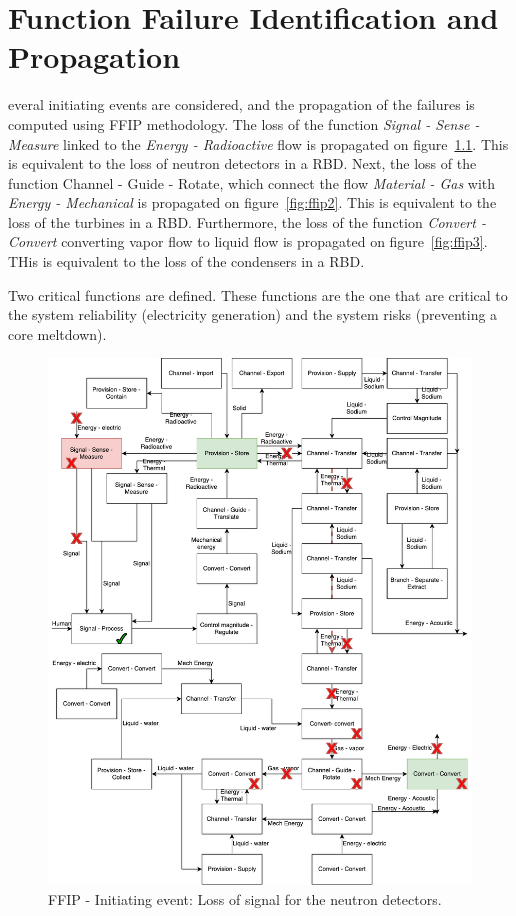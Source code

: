 %
%

\chapter{Function Failure Identification and Propagation}
\label{app:app04}

everal initiating events are considered, and the propagation of the failures is computed using FFIP methodology. The loss of the function \textit{Signal - Sense - Measure} linked to the \textit{Energy - Radioactive} flow is propagated on figure~\ref{fig:ffip1}. This is equivalent to the loss of neutron detectors in a RBD. Next, the loss of the function {Channel - Guide - Rotate}, which connect the flow \textit{Material - Gas} with \textit{Energy - Mechanical} is propagated on figure~\ref{fig:ffip2}. This is equivalent to the loss of the turbines in a RBD. Furthermore, the loss of the function \textit{Convert - Convert} converting vapor flow to liquid flow is propagated on figure~\ref{fig:ffip3}. THis is equivalent to the loss of the condensers in a RBD.

Two critical functions are defined. These functions are the one that are critical to the system reliability (electricity generation) and the system risks (preventing a core meltdown).

\begin{figure}[t]
\centering
\includegraphics[scale=.55]{fig0d/FFIP_1}
\caption{FFIP - Initiating event: Loss of signal for the neutron detectors.}
\label{fig:ffip1}
\end{figure}

